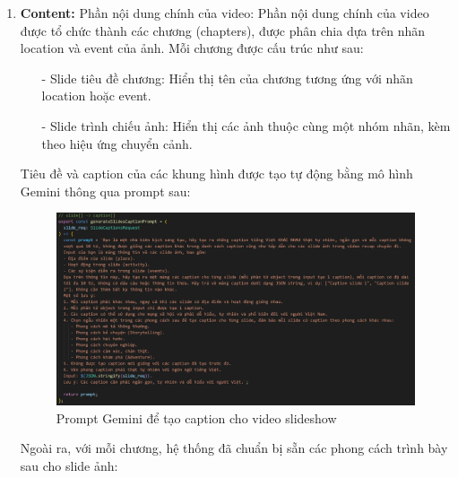 \begin{enumerate}
    \item \textbf{Content:} Phần nội dung chính của video:
    Phần nội dung chính của video được tổ chức thành các chương (chapters), được phân chia dựa trên nhãn location và event của ảnh. Mỗi chương được cấu trúc như sau:
    \begin{itemize}
        \item[-] Slide tiêu đề chương: Hiển thị tên của chương tương ứng với nhãn location hoặc event. 
        \item[-] Slide trình chiếu ảnh: Hiển thị các ảnh thuộc cùng một nhóm nhãn, kèm theo hiệu ứng chuyển cảnh.
    \end{itemize}
    
    Tiêu đề và caption của các khung hình được tạo tự động bằng mô hình Gemini thông qua prompt sau:
    
    \begin{figure}[H]
        \centering  
        \includegraphics[width=1\textwidth]{figures/c4/4_1/prompt.png}
        \caption{Prompt Gemini để tạo caption cho video slideshow}
        \label{fig:gemini-prompt}
    \end{figure}
    
    Ngoài ra, với mỗi chương, hệ thống đã chuẩn bị sẵn các phong cách trình bày sau cho slide ảnh:
    

\end{enumerate}
